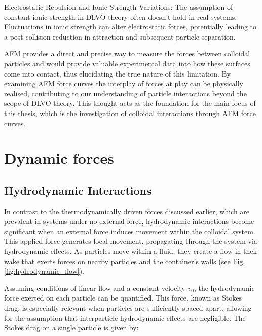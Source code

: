 Electrostatic Repulsion and Ionic Strength Variations: The assumption of constant ionic strength in DLVO theory often doesn't hold in real systems. Fluctuations in ionic strength can alter electrostatic forces, potentially leading to a post-collision reduction in attraction and subsequent particle separation.

 AFM provides a direct and precise way to measure the forces between colloidal particles and would provide valuable experimental data into how these surfaces come into contact, thus elucidating the true nature of this limitation. By examining AFM force curves the interplay of forces at play can be physically realised, contributing to our understanding of particle interactions beyond the scope of DLVO theory. This thought acts as the foundation for the main focus of this thesis, which is the investigation of colloidal interactions through AFM force curves. \cite{AdvancedColloidModels, SurfaceHeterogeneityStudy, DynamicInteractionsResearch, HydrationForcesArticle, AFMForceCurvesReference}


\section{Dynamic forces}

\subsection{Hydrodynamic Interactions}

In contrast to the thermodynamically driven forces discussed earlier, which are prevalent in systems under no external force, hydrodynamic interactions become significant when an external force induces movement within the colloidal system. This applied force generates local movement, propagating through the system via hydrodynamic effects. As particles move within a fluid, they create a flow in their wake that exerts forces on nearby particles and the container's walls (see Fig. \ref{fig:hydrodynamic_flow}).


Assuming conditions of linear flow and a constant velocity \( v_0 \), the hydrodynamic force exerted on each particle can be quantified. This force, known as Stokes drag, is especially relevant when particles are sufficiently spaced apart, allowing for the assumption that interparticle hydrodynamic effects are negligible. The Stokes drag on a single particle is given by:

